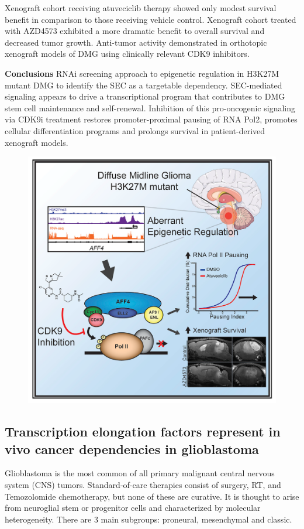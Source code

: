 Xenograft cohort receiving atuveciclib therapy
showed only modest survival benefit in
comparison to those receiving vehicle control.
Xenograft cohort treated with AZD4573
exhibited a more dramatic benefit to overall
survival and decreased tumor growth.
Anti-tumor activity demonstrated in orthotopic xenograft models of DMG using clinically relevant CDK9 inhibitors.

\textbf{Conclusions}
RNAi screening approach to epigenetic regulation in
H3K27M mutant DMG to identify the SEC as a
targetable dependency.
SEC-mediated signaling appears to drive a
transcriptional program that contributes to DMG stem
cell maintenance and self-renewal.
Inhibition of this pro-oncogenic signaling via CDK9i
treatment restores promoter-proximal pausing of RNA
Pol2, promotes cellular differentiation programs and
prolongs survival in patient-derived xenograft models.

\begin{figure}
\centering
\includegraphics[width=\textwidth]{../_resources/Screen_Shot_2022-12-20_at_12-43-26.png}
\caption{}
\end{figure}

\subsection{Transcription elongation factors represent in vivo cancer dependencies in glioblastoma}
Glioblastoma is the most common of all primary malignant central nervous system (CNS) tumors. Standard-of-care therapies consist of surgery, RT, and Temozolomide chemotherapy, but none of these are curative. It is thought to arise from neuroglial stem or progenitor cells and characterized by molecular heterogeneity. There are 3 main subgroups: proneural, mesenchymal and classic.

